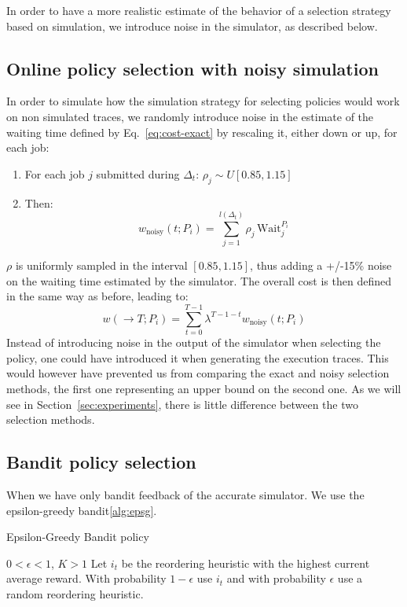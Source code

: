 \documentclass[sigconf]{acmart}
\begin{document}
In order to have a more realistic estimate of the behavior of a selection strategy based on simulation, we introduce noise in the simulator, as described below.

\subsection{Online policy selection with noisy simulation}
\label{sub:noisy}

In order to simulate how the simulation strategy for selecting policies would work on non simulated traces, we randomly introduce noise in the estimate of the waiting time defined by Eq.~\ref{eq:cost-exact} by rescaling it, either down or up, for each job:
%
\begin{enumerate}
\item For each job $j$ submitted during $\Delta_t$: $\rho_j \sim U[0.85,1.15]$
\item Then:
%
\begin{equation}
\label{eq:cost-noisy}
w_{\mbox{noisy}}(t;P_i) = \sum_{j=1}^{l(\Delta_t)} \rho_j \, \mbox{Wait}_j^{P_i}
\end{equation}
%
\end{enumerate}
%
$\rho$ is uniformly sampled in the interval $[0.85,1.15]$, thus adding a +/-15\% noise on the waiting time estimated by the simulator. The overall cost is then defined in the same way as before, leading to:
%
\begin{equation}
\label{eq:tot-cost-noisy}
w(\rightarrow T;P_i) = \sum_{t=0}^{T-1} \lambda^{T-1-t} w_{\mbox{noisy}}(t;P_i)
\end{equation}
%
Instead of introducing noise in the output of the simulator when selecting the policy, one could have introduced it when generating the execution traces. This would however have prevented us from comparing the exact and noisy selection methods, the first one representing an upper bound on the second one. As we will see in Section~\ref{sec:experiments}, there is little difference between the two selection methods.

\subsection{Bandit policy selection}
\label{sub:bandit}

When we have only bandit feedback of the accurate simulator.
We use the epsilon-greedy bandit\ref{alg:epsg}.

\begin{algorithm}[h]
  \caption{Epsilon-Greedy Bandit policy}
  \begin{algorithmic}[1]
    \renewcommand{\algorithmicrequire}{\textbf{Input:}}
    \renewcommand{\algorithmicensure}{\textbf{Output:}}
    \REQUIRE $0 < \epsilon < 1$, $K>1$
    \STATE Let $i_t$ be the reordering heuristic with the highest current
    average reward.
    \STATE With probability $1-\epsilon$ use $i_t$ and with probability
    $\epsilon$ use a random reordering heuristic.
    \ENDFOR
  \end{algorithmic}
  \label{alg:epsg}
\end{algorithm}
\end{document}

